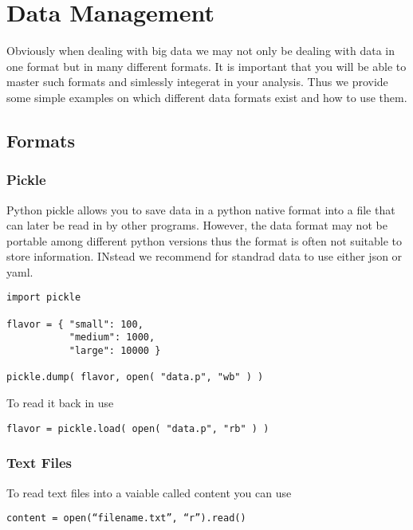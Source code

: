 \chapter{Data Management}

\FILENAME

Obviously when dealing with big data we may not only be dealing with
data in one format but in many different formats. It is important that
you will be able to master such formats and simlessly integerat in
your analysis. Thus we provide some simple examples on which different
data formats exist and how to use them.

\section{Formats}

\subsection{Pickle}

Python pickle allows you to save data in a python native format into a file
that can later be read in by other programs. However, the data format
may not be portable among different python versions thus the format is
often not suitable to store information. INstead we recommend for
standrad data to use either json or yaml.

\begin{verbatim}
import pickle

flavor = { "small": 100, 
           "medium": 1000,
           "large": 10000 }

pickle.dump( flavor, open( "data.p", "wb" ) )

\end{verbatim}

To read it back in use

\begin{verbatim}
flavor = pickle.load( open( "data.p", "rb" ) )
\end{verbatim}

\subsection{Text Files}

To read text files into a vaiable called content  you can use 

\begin{verbatim}
content = open(“filename.txt”, “r”).read() 
\end{verbatim}

